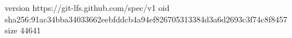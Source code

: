 version https://git-lfs.github.com/spec/v1
oid sha256:91ac34bba34033662eebfddcb4a94ef826705313384d3a6d2693c3f74c8f8457
size 44641
